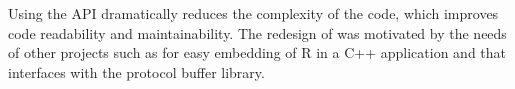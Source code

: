 Using the  API dramatically reduces the complexity 
of the code, which improves code readability and maintainability.
The redesign of  was motivated by the needs of other 
projects such as   \citep{cran:rinside} for easy embedding 
of R in a C++ application and  \citep{cran:rprotobuf} 
that interfaces with the protocol buffer library. 



\address{Dirk Eddelbuettel\\
  Debian Project\\
  Chicago, IL\\
  USA}\\

\address{Romain Fran\c{c}ois\\
  Professionnal R Enthusiast\\
  3 rue Emile Bonnet, 34 090 Montpellier\\
  FRANCE}\\

